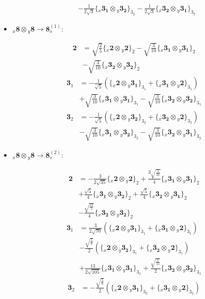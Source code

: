 \documentclass[english]{article}
\newcommand{\rep}[1]{\mathbf{#1}}
\newcommand{\repx}[2]{{}_{#2}\mathbf{#1}}
\newcommand{\tsprodx}[2]{\repx{#1}{x}\otimes\repx{#2}{y}}
\newcommand{\subcgs}[3]{\big\{ \tsprodx{#1}{#2}\big\}^{}_{#3}}
\begin{document}
\begin{itemize}
\begin{fleqn}
\begin{align*}
 & -\frac{1}{2 \sqrt{3}}\subcgs{3_{1}}{3_{2}}{3_{2}}-\frac{1}{2 \sqrt{3}}\subcgs{3_{2}}{3_{1}}{3_{2}}
\end{align*}
\end{fleqn}
\item $\tsprodx{8}{8}\to\rep{8}_{s}^{(1)}$:
\begin{fleqn}
\begin{align*}
\rep{2} & = \sqrt{\frac{2}{5}}\subcgs{2}{2}{2}-\sqrt{\frac{3}{10}}\subcgs{3_{1}}{3_{1}}{2} \\ 
 & -\sqrt{\frac{3}{10}}\subcgs{3_{2}}{3_{2}}{2}
\end{align*}
\begin{align*}
\rep{3}_{1} & = -\frac{1}{\sqrt{5}}\left(\subcgs{2}{3_{1}}{3_{1}}+\subcgs{3_{1}}{2}{3_{1}}\right) \\ 
 & +\sqrt{\frac{3}{10}}\subcgs{3_{1}}{3_{1}}{3_{1}}-\sqrt{\frac{3}{10}}\subcgs{3_{2}}{3_{2}}{3_{1}}
\end{align*}
\begin{align*}
\rep{3}_{2} & = -\frac{1}{\sqrt{5}}\left(\subcgs{2}{3_{2}}{3_{2}}+\subcgs{3_{2}}{2}{3_{2}}\right) \\ 
 & -\sqrt{\frac{3}{10}}\subcgs{3_{1}}{3_{2}}{3_{2}}-\sqrt{\frac{3}{10}}\subcgs{3_{2}}{3_{1}}{3_{2}}
\end{align*}
\end{fleqn}
\item $\tsprodx{8}{8}\to\rep{8}_{s}^{(2)}$:
\begin{fleqn}
\begin{align*}
\rep{2} & = -\frac{3}{2 \sqrt{35}}\subcgs{2}{2}{2}+\frac{3 \sqrt{\frac{3}{35}}}{4}\subcgs{3_{1}}{3_{1}}{2} \\ 
 & +\frac{\sqrt{5}}{4}\subcgs{3_{1}}{3_{2}}{2}+\frac{\sqrt{5}}{4}\subcgs{3_{2}}{3_{1}}{2} \\ 
 & -\frac{\sqrt{\frac{21}{5}}}{4}\subcgs{3_{2}}{3_{2}}{2}
\end{align*}
\begin{align*}
\rep{3}_{1} & = \frac{3}{2 \sqrt{70}}\left(\subcgs{2}{3_{1}}{3_{1}}+\subcgs{3_{1}}{2}{3_{1}}\right) \\ 
 & -\frac{\sqrt{\frac{5}{6}}}{2}\left(\subcgs{2}{3_{2}}{3_{1}}+\subcgs{3_{2}}{2}{3_{1}}\right) \\ 
 & +\frac{13}{2 \sqrt{105}}\subcgs{3_{1}}{3_{1}}{3_{1}}+\frac{\sqrt{\frac{7}{15}}}{2}\subcgs{3_{2}}{3_{2}}{3_{1}}
\end{align*}
\begin{align*}
\rep{3}_{2} & = -\frac{\sqrt{\frac{5}{6}}}{2}\left(\subcgs{2}{3_{1}}{3_{2}}+\subcgs{3_{1}}{2}{3_{2}}\right) \\ 

\end{align*}
\end{fleqn}
\end{itemize}
\end{document}
